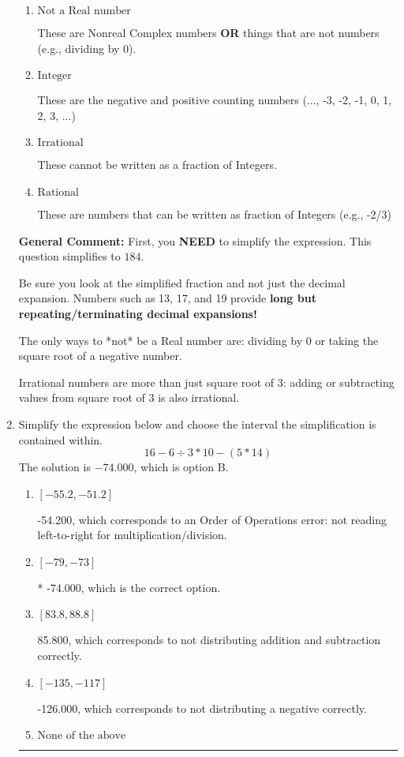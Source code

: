 \documentclass{extbook}[14pt]
\newcommand{\litem}[1]{\item #1

\rule{\textwidth}{0.4pt}}
\begin{document}
\begin{enumerate}
{\begin{enumerate}[label=\Alph*.]
* This is the correct option!
\item \( \text{Not a Real number} \)

These are Nonreal Complex numbers \textbf{OR} things that are not numbers (e.g., dividing by 0).
\item \( \text{Integer} \)

These are the negative and positive counting numbers (..., -3, -2, -1, 0, 1, 2, 3, ...)
\item \( \text{Irrational} \)

These cannot be written as a fraction of Integers.
\item \( \text{Rational} \)

These are numbers that can be written as fraction of Integers (e.g., -2/3)
\end{enumerate}

\textbf{General Comment:} First, you \textbf{NEED} to simplify the expression. This question simplifies to $184$. 
 
 Be sure you look at the simplified fraction and not just the decimal expansion. Numbers such as 13, 17, and 19 provide \textbf{long but repeating/terminating decimal expansions!} 
 
 The only ways to *not* be a Real number are: dividing by 0 or taking the square root of a negative number. 
 
 Irrational numbers are more than just square root of 3: adding or subtracting values from square root of 3 is also irrational.
}
\litem{
Simplify the expression below and choose the interval the simplification is contained within.
\[ 16 - 6 \div 3 * 10 - (5 * 14) \]The solution is \( -74.000 \), which is option B.\begin{enumerate}[label=\Alph*.]
\item \( [-55.2, -51.2] \)

 -54.200, which corresponds to an Order of Operations error: not reading left-to-right for multiplication/division.
\item \( [-79, -73] \)

* -74.000, which is the correct option.
\item \( [83.8, 88.8] \)

 85.800, which corresponds to not distributing addition and subtraction correctly.
\item \( [-135, -117] \)

 -126.000, which corresponds to not distributing a negative correctly.
\item \( \text{None of the above} \)


\end{enumerate}}
\end{enumerate}
\end{document}
